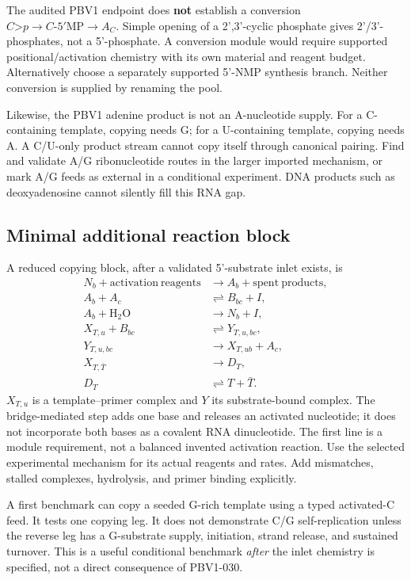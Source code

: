 \documentclass[11pt]{article}
\newcommand{\cp}{\mathord{>}p}
\begin{document}
The audited PBV1 endpoint does \textbf{not} establish a conversion
$C\cp\to C\text{-}5'\mathrm{MP}\to A_C$. Simple opening of a 2',3'-cyclic phosphate
gives 2'/3'-phosphates, not a 5'-phosphate. A conversion module would require
supported positional/activation chemistry with its own material and reagent
budget. Alternatively choose a separately supported 5'-NMP synthesis branch.
Neither conversion is supplied by renaming the pool.

Likewise, the PBV1 adenine product is not an A-nucleotide supply. For a
C-containing template, copying needs G; for a U-containing template, copying
needs A. A C/U-only product stream cannot copy itself through canonical pairing.
Find and validate A/G ribonucleotide routes in the larger imported mechanism,
or mark A/G feeds as external in a conditional experiment. DNA products such
as deoxyadenosine cannot silently fill this RNA gap.

\subsection{Minimal additional reaction block}
A reduced copying block, after a validated 5'-substrate inlet exists, is
\begin{align}
N_b+\mathrm{activation\ reagents}&\longrightarrow A_b+\mathrm{spent\ products},\\
A_b+A_c&\rightleftharpoons B_{bc}+I,\\
A_b+\mathrm{H_2O}&\longrightarrow N_b+I,\\
X_{T,u}+B_{bc}&\rightleftharpoons Y_{T,u,bc},\\
Y_{T,u,bc}&\longrightarrow X_{T,ub}+A_c,\\
X_{T,\bar T}&\longrightarrow D_T,\\
D_T&\rightleftharpoons T+\bar T.
\end{align}
$X_{T,u}$ is a template--primer complex and $Y$ its substrate-bound complex.
The bridge-mediated step adds one base and releases an activated nucleotide;
it does not incorporate both bases as a covalent RNA dinucleotide. The first
line is a module requirement, not a balanced invented activation reaction.
Use the selected experimental mechanism for its actual reagents and rates.
Add mismatches, stalled complexes, hydrolysis, and primer binding explicitly.

A first benchmark can copy a seeded G-rich template using a typed activated-C
feed. It tests one copying leg. It does not demonstrate C/G self-replication
unless the reverse leg has a G-substrate supply, initiation, strand release,
and sustained turnover. This is a useful conditional benchmark \emph{after}
the inlet chemistry is specified, not a direct consequence of PBV1-030.
\end{document}
